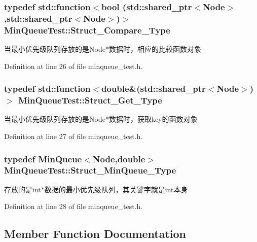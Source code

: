 \subsubsection[{Struct\+\_\+\+Compare\+\_\+\+Type}]{\setlength{\rightskip}{0pt plus 5cm}typedef std\+::function$<$bool (std\+::shared\+\_\+ptr$<${\bf Node}$>$,std\+::shared\+\_\+ptr$<${\bf Node}$>$)$>$ {\bf Min\+Queue\+Test\+::\+Struct\+\_\+\+Compare\+\_\+\+Type}}\label{class_min_queue_test_a25bfd5b74968c587db57133f107a5f61}
当最小优先级队列存放的是\+Node$\ast$数据时，相应的比较函数对象 

Definition at line 26 of file minqueue\+\_\+test.\+h.

\hypertarget{class_min_queue_test_aebcf6172ed7e9dd6f821fb1043f1cd6f}{}
\subsubsection[{Struct\+\_\+\+Get\+\_\+\+Type}]{\setlength{\rightskip}{0pt plus 5cm}typedef std\+::function$<$double\&(std\+::shared\+\_\+ptr$<${\bf Node}$>$)$>$ {\bf Min\+Queue\+Test\+::\+Struct\+\_\+\+Get\+\_\+\+Type}}\label{class_min_queue_test_aebcf6172ed7e9dd6f821fb1043f1cd6f}
当最小优先级队列存放的是\+Node$\ast$数据时，获取key的函数对象 

Definition at line 27 of file minqueue\+\_\+test.\+h.

\hypertarget{class_min_queue_test_a9b7e5e987d5e856adc5beb6986dd96a3}{}
\subsubsection[{Struct\+\_\+\+Min\+Queue\+\_\+\+Type}]{\setlength{\rightskip}{0pt plus 5cm}typedef {\bf Min\+Queue}$<${\bf Node},double$>$ {\bf Min\+Queue\+Test\+::\+Struct\+\_\+\+Min\+Queue\+\_\+\+Type}}\label{class_min_queue_test_a9b7e5e987d5e856adc5beb6986dd96a3}
存放的是int$\ast$数据的最小优先级队列，其关键字就是int本身 

Definition at line 28 of file minqueue\+\_\+test.\+h.



\subsection{Member Function Documentation}
\hypertarget{class_min_queue_test_ae801d45bf78b7bb80b278264d3a8e96a}{}
